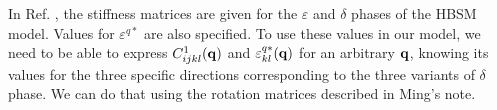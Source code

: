 In Ref. \cite{HBSMZC07}, the stiffness matrices are given for the
$\varepsilon$ and $\delta$ phases of the HBSM model.  Values for
$\varepsilon^{q*}$ are also specified.  To use these values in our
model, we need to be able to express $C_{ijkl}^1({\bf q})$ and
$\varepsilon_{kl}^{q*}({\bf q})$ for an arbitrary ${\bf q}$, knowing
its values for the three specific directions corresponding to the
three variants of $\delta$ phase.  We can do that using the rotation
matrices described in Ming's note\cite{MT1}.


